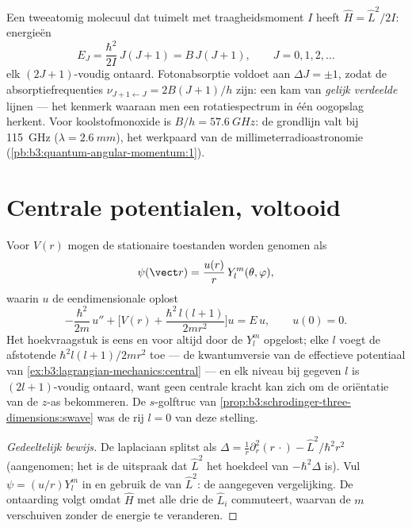 \begin{example}\label{ex:b3:quantum-angular-momentum:rotor}
Een tweeatomig molecuul dat tuimelt met traagheidsmoment $I$ heeft $\hat H
= \hat L^2/2I$: energieën
\[
E_J = \frac{\hbar^2}{2I}\,J(J+1) = B\,J(J+1) ,
\qquad J = 0, 1, 2, \dots
\]
elk $(2J+1)$-voudig ontaard. Fotonabsorptie voldoet aan $\Delta J =
\pm1$,
zodat de absorptiefrequenties $\nu_{J+1\leftarrow J} =
2B(J+1)/h$ zijn:
een kam van \emph{gelijk verdeelde} lijnen --- het kenmerk waaraan men een
rotatiespectrum in één oogopslag herkent. Voor koolstofmonoxide is $B/h = \qty{57.6}{GHz}$: de grondlijn valt bij \qty{115}{GHz} ($\lambda = \qty{2.6}{mm}$), het werkpaard van de millimeterradioastronomie
(\cref{pb:b3:quantum-angular-momentum:1}).
\end{example}

\section{Centrale potentialen, voltooid}

\begin{theorem}\label{thm:b3:quantum-angular-momentum:radial}
Voor $V(r)$ mogen de stationaire toestanden worden genomen als
\[
\psi(\vect r) = \frac{u(r)}{r}\,Y_l^m(\theta, \varphi) ,
\]
waarin $u$ de eendimensionale  oplost
\[
-\frac{\hbar^2}{2m}\,u'' + \Big[V(r) +
\frac{\hbar^2\,l(l+1)}{2mr^2}\Big]u = E\,u , \qquad u(0) = 0 .
\]
Het hoekvraagstuk is eens en voor altijd door de $Y_l^m$ opgelost; elke
$l$ voegt de afstotende \emph{}
$\hbar^2l(l+1)/2mr^2$ toe --- de kwantumversie van de effectieve
potentiaal van \cref{ex:b3:lagrangian-mechanics:central} --- en elk niveau
bij gegeven $l$ is $(2l+1)$-voudig ontaard, want geen centrale kracht kan
zich om de oriëntatie van de $z$-as bekommeren. De $s$-golftruc van
\cref{prop:b3:schrodinger-three-dimensions:swave} was de rij $l = 0$ van
deze stelling.
\end{theorem}

\begin{proof}[Gedeeltelijk bewijs]
De laplaciaan splitst als $\Delta = \tfrac1r\partial_r^2(r\,\cdot) -
\hat L^2/\hbar^2r^2$ (aangenomen; het is de uitspraak dat $\hat L^2$ het
hoekdeel van $-\hbar^2\Delta$ is). Vul $\psi = (u/r)Y_l^m$ in en gebruik
de  van $\hat L^2$: de aangegeven vergelijking. De ontaarding
volgt omdat $\hat H$ met alle drie de $\hat
L_i$ commuteert, waarvan de
 $m$ verschuiven zonder de energie te veranderen.
\end{proof}

